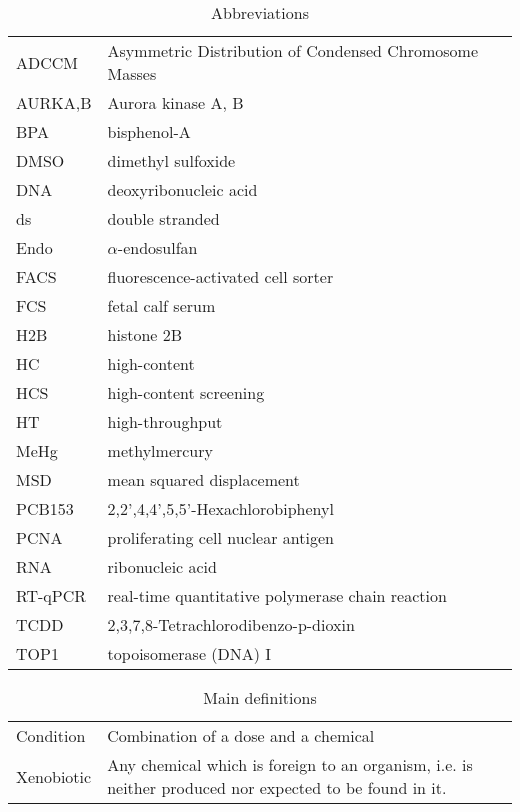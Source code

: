 \documentclass[11pt, oneside]{Thesis} %
\begin{document}
\listoftables %


\clearpage %
\begin{table}
\caption{Abbreviations}
\begin{tabular}{ll}
ADCCM &Asymmetric Distribution of Condensed Chromosome Masses\\
AURKA,B & Aurora kinase A, B\\
BPA & bisphenol-A \\
DMSO & dimethyl sulfoxide\\
DNA & deoxyribonucleic acid\\
ds & double stranded \\
Endo & $\alpha$-endosulfan \\
FACS & fluorescence-activated cell sorter\\
FCS & fetal calf serum\\
H2B & histone 2B\\
HC & high-content\\
HCS & high-content screening\\
HT & high-throughput\\
MeHg & methylmercury\\
MSD & mean squared displacement\\
PCB153 & 2,2',4,4',5,5'-Hexachlorobiphenyl\\
PCNA & proliferating cell nuclear antigen\\
RNA & ribonucleic acid\\
RT-qPCR & real-time quantitative polymerase chain reaction\\
TCDD & 2,3,7,8-Tetrachlorodibenzo-p-dioxin\\
TOP1 & topoisomerase (DNA) I\\
\end{tabular}
\end{table}
\begin{table}
\caption{Main definitions}
\begin{tabular}{lL{10cm}}
Condition & Combination of a dose and a chemical\\
Xenobiotic & Any chemical which is foreign to an organism, i.e. is neither produced nor expected to be found in it.
\end{tabular}
\end{table}
\clearpage %
\end{document}
